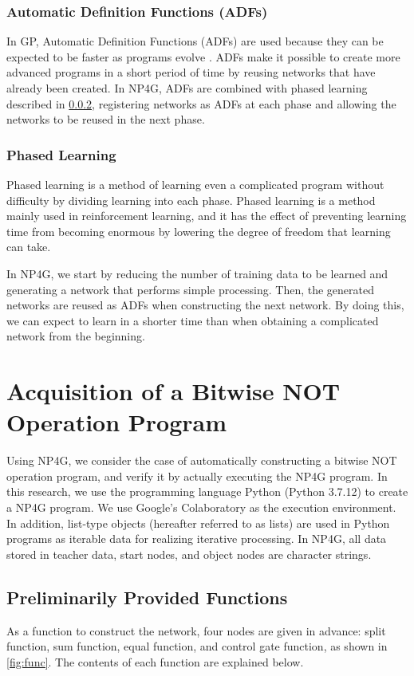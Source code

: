 \documentclass{article}
\begin{document}
\subsubsection {Automatic Definition Functions (ADFs)}
In GP, Automatic Definition Functions (ADFs) are used because they can be expected to be faster as programs evolve \cite{adfs}.
ADFs make it possible to create more advanced programs in a short period of time by reusing networks that have already been created.
In NP4G, ADFs are combined with phased learning described in \ref{sec:PL}, registering networks as ADFs at each phase and allowing the networks to be reused in the next phase.

\subsubsection {Phased Learning}
\label{sec:PL}
Phased learning is a method of learning even a complicated program without difficulty by dividing learning into each phase.
Phased learning is a method mainly used in reinforcement learning, and it has the effect of preventing learning time from becoming enormous by lowering the degree of freedom that learning can take.

In NP4G, we start by reducing the number of training data to be learned and generating a network that performs simple processing.
Then, the generated networks are reused as ADFs when constructing the next network.
By doing this, we can expect to learn in a shorter time than when obtaining a complicated network from the beginning.

\section {Acquisition of a Bitwise NOT Operation Program}
Using NP4G, we consider the case of automatically constructing a bitwise NOT operation program, and verify it by actually executing the NP4G program.
In this research, we use the programming language Python (Python 3.7.12) to create a NP4G program.
We use Google's Colaboratory as the execution environment.
In addition, list-type objects (hereafter referred to as lists) are used in Python programs as iterable data for realizing iterative processing.
In NP4G, all data stored in teacher data, start nodes, and object nodes are character strings.

\subsection {Preliminarily Provided Functions}
As a function to construct the network, four nodes are given in advance: split function, sum function, equal function, and control gate function, as shown in \ref{fig:func}.
The contents of each function are explained below.
\end{document}
